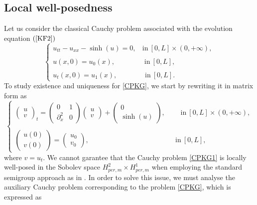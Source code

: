 \documentclass[12pt,reqno,a4paper]{amsart} %
\numberwithin{equation}{section}
\numberwithin{figure}{section}
\begin{document}
\subsection{Local well-posedness} 
Let us consider the classical Cauchy problem associated with the evolution equation $(\ref{KF2})$
\begin{equation}\label{CPKG}
	\left\{\begin{array}{llll}
		u_{tt}-u_{xx}-\sinh(u)=0, \:\:\:\: \text{in} \: [0,L]\times(0,+\infty), \\\\
		u(x,0)=u_0(x),\:\:\:\:\:\:\:\:\:\:\:\:\:\:\:\:\:\:\: \text{in} \: [0,L],\\\\
		u_t(x,0)= u_1(x),\:\:\:\:\:\:\:\:\:\:\:\:\:\:\:\:\:\: \text{in} \: [0,L].
	\end{array}\right.
\end{equation}
To study existence and uniqueness for \eqref{CPKG}, we start by rewriting it in matrix form as
\begin{equation}\label{CPKG1}
	\begin{cases}
		\left(\begin{array}{lll}u\\v\end{array}\right)_t
		=\left(\begin{array}{lll}0&  1\\ \partial_x^2&  0\end{array}\right)\left(\begin{array}{lll}u\\v\end{array}\right)+\left(\begin{array}{ccc}0\\ \sinh(u)\end{array}\right),\:\:\:\:\:\:\:\:\:\: \text{in} \: [0,L]\times(0,+\infty),\\\\
		\left(\begin{array}{llll}u(0)\\v(0)\end{array}\right)=\left(\begin{array}{ccc}u_0\\ v_0\end{array}\right),\:\:\:\:\:\:\:\:\:\:\:\:\:\:\:\:\:\:\:\:\:\:\:\:\:\:\:\:\:\:\:\:\:\:\:\:\:\:\:\:\:\:\:\:\:\:\:\:\:\:\:\: \:\:\:\:\text{in} \: [0,L],
	\end{cases}
\end{equation}
where $v=u_t$. We cannot garantee that the Cauchy problem \eqref{CPKG1} is locally well-posed in the Sobolev space $H_{per,m}^2\times H_{per,m}^1$ when employing the standard semigroup approach as in \cite{pazy}. In order to solve this issue, we must analyse the auxiliary Cauchy problem corresponding to the problem \eqref{CPKG}, which is expressed as
\end{document}
